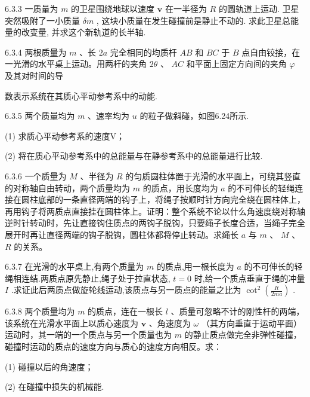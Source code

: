 \begin{problem}{6.3.3}
一质量为 $m$ 的卫星围绕地球以速度 $\bm{v}$ 在一半径为 $R$ 的圆轨道上运动. 卫星突然吸附了一小质量 $\delta m$ , 这块小质量在发生碰撞前是静止不动的. 求此卫星总能量的改变量, 并求这个新轨道的长半轴.
\end{problem}
\clearpage


\begin{problem}{6.3.4}
两根质量为 $m$ 、长 $2a$ 完全相同的均质杆 $AB$ 和 $BC$ 于 $B$ 点自由铰接，在一光滑的水平桌上运动。用两杆的夹角 $2\theta$ 、 $AC$ 和平面上固定方向间的夹角 $\varphi$ 及其对时间的导

数表示系统在其质心平动参考系中的动能.
\begin{center}

\end{center}
\end{problem}
\clearpage


\begin{problem}{6.3.5}
两个质量均为 $m$ 、速率均为 $u$ 的粒子做斜碰，如图6.24所示.

(1) 求质心平动参考系的速度V；

(2) 将在质心平动参考系中的总能量与在静参考系中的总能量进行比较.
\begin{center}

\end{center}
\end{problem}
\clearpage


\begin{problem}{6.3.6}
一个质量为 $M$ 、半径为 $R$ 的匀质圆柱体置于光滑的水平面上，可绕其竖直的对称轴自由转动，两个质量均为 $m$ 的质点，用长度均为 $a$ 的不可伸长的轻绳连接在圆柱底部的一条直径两端的钩子上，将绳子按顺时针方向完全绕在圆柱体上，再用钩子将两质点直接挂在圆柱体上。证明：整个系统不论以什么角速度绕对称轴逆时针转动时，先让直接钩住质点的两钩子脱钩，只要绳子长度合适，当绳子完全展开时再让直径两端的钩子脱钩，圆柱体都将停止转动。求绳长 $a$ 与 $m$ 、 $M$ 、 $R$ 的关系。
\end{problem}
\clearpage


\begin{problem}{6.3.7}
在光滑的水平桌上,有两个质量为 $m$ 的质点,用一根长度为 $a$ 的不可伸长的轻绳相连结.两质点原先静止,绳子处于拉直状态, $t=0$ 时,给一个质点垂直于绳的冲量 $I$ .求证此后两质点做旋轮线运动,该质点与另一质点的能量之比为 $\cot^{2}\left(\frac{It}{2ma}\right)$ .
\end{problem}
\clearpage


\begin{problem}{6.3.8}
两个质量均为 $m$ 的质点，连在一根长 $l$ 、质量可忽略不计的刚性杆的两端，该系统在光滑水平面上以质心速度为 $\bm{v}$ 、角速度为 $\omega$ （其方向垂直于运动平面）运动时，其一端的一个质点与另一个质量也为 $m$ 的静止质点做完全非弹性碰撞，碰撞时运动的质点的速度方向与质心的速度方向相反。求：

(1) 碰撞以后的角速度；

(2) 在碰撞中损失的机械能.
\end{problem}
\clearpage



